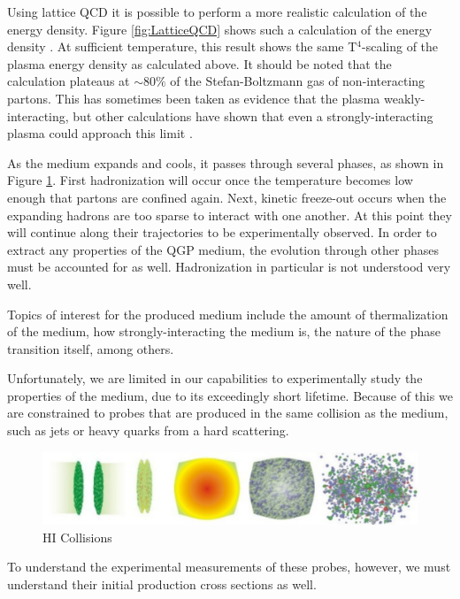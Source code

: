 Using lattice QCD it is possible to perform a more realistic calculation of the energy density.
Figure \ref{fig:LatticeQCD} shows such a calculation of the energy density \cite{LQCD1}. 
At sufficient temperature, this result shows the same T$^4$-scaling of the plasma energy density 
as calculated above. It should be noted that the calculation plateaus at $\sim$80$\%$ of the 
Stefan-Boltzmann gas of non-interacting partons. This
has sometimes been taken as evidence that the plasma weakly-interacting, but other calculations
have shown that even a strongly-interacting plasma could approach this limit \cite{LQCD2}.

As the medium expands and cools, it passes through several phases, as shown in Figure \ref{fig:HICollWhite}.
First hadronization will occur once the temperature becomes low enough that partons are confined
again. Next, kinetic freeze-out occurs when the expanding hadrons are too sparse to interact with
one another. At this point they will continue along their trajectories to be experimentally observed.
In order to extract any properties of the QGP medium, the evolution through other phases must
be accounted for as well. Hadronization in particular is not understood very well.

Topics of interest for the produced medium include the amount of thermalization of the
medium, how strongly-interacting the medium is, the nature of the phase transition itself, among
others.

Unfortunately, we are limited in our capabilities to experimentally study the properties of the
medium, due to its exceedingly short lifetime. Because of this we are constrained to probes that are
produced in the same collision as the medium, such as jets or heavy quarks from a hard scattering.


\begin{figure}
  \includegraphics[width=\hugefigwidth]{chap_SMAndQGP_figures/HICollisions_White}
  \caption[HeavyIon Collisions]%
  {HI Collisions}
  \label{fig:HICollWhite}
\end{figure}

To understand the experimental measurements of these probes, however, we must understand their
initial production cross sections as well.


